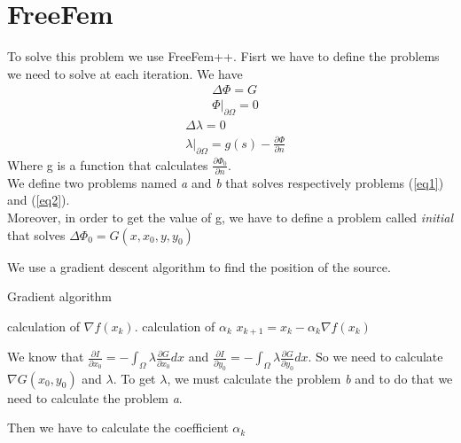 
\section{FreeFem}
To solve this problem we use FreeFem++. Fisrt we have to define the problems we need to solve at each iteration. 
We have 
\begin{align}\label{eq1}
& \Delta \Phi = G \\
& \left. \Phi\right|_{\partial\Omega} = 0\nonumber
\end{align}
\begin{align}\label{eq2}
& \Delta \lambda = 0 \\
& \left. \lambda\right|_{\partial\Omega} = g(s)-\frac{\partial \Phi}{\partial n}\nonumber
\end{align}
Where g is a function that calculates $\frac{\partial \Phi_0}{\partial n}$. \\
We define two problems named \textit{a} and \textit{b} that solves respectively problems (\ref{eq1}) and (\ref{eq2}).\\
Moreover, in order to get the value of g, we have to define a problem called \textit{initial} that solves $\Delta \Phi_0 = G(x,x_0,y,y_0)$


We use a gradient descent algorithm to find the position of the source.\\
\begin{algorithm}
\caption{Gradient algorithm}
\begin{algorithmic} 
\STATE calculation of $\nabla f(x_k)$.
\STATE calculation of $\alpha_k$
\STATE $x_{k+1} = x_k - \alpha_k \nabla f(x_k)$
\ENDWHILE
\end{algorithmic}
\end{algorithm}

We know that $\frac{\partial I}{\partial x_0} = -\int_{\Omega}\lambda \frac{\partial G}{\partial x_0} dx$ and $\frac{\partial I}{\partial y_0} = -\int_{\Omega}\lambda \frac{\partial G}{\partial y_0} dx$. So we need to calculate $\nabla G(x_0,y_0)$ and $\lambda$. To get $\lambda$, we must calculate the problem \textit{b} and to do that we need to calculate the problem \textit{a}.

Then we have to calculate the coefficient $\alpha_k$


